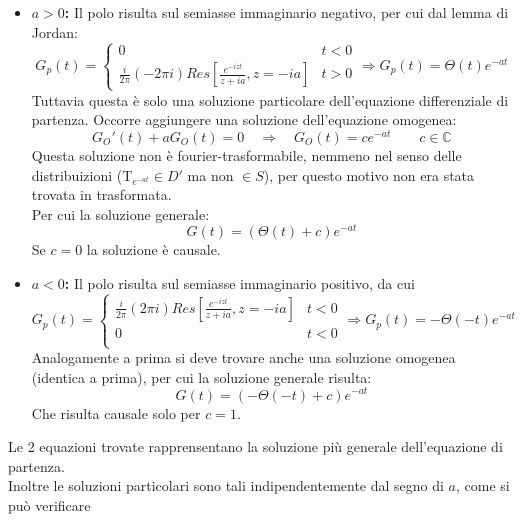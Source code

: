 \documentclass[twoside]{article}
\begin{document}
\begin{itemize}
    \item \textbf{$a>0$:} Il polo risulta sul semiasse immaginario negativo, per cui dal lemma di Jordan:
    \begin{equation}
       G_p(t)= \begin{cases}
            0 & t<0\\
            \frac{i}{2\pi}(-2\pi i) Res\left[\frac{e^{-izt}}{z+ia},z=-ia\right] & t>0
        \end{cases} \Longrightarrow
        G_p(t)=\Theta(t)e^{-at}
    \end{equation}
Tuttavia questa è solo una soluzione particolare dell'equazione differenziale di partenza. Occorre aggiungere una soluzione dell'equazione omogenea:
\begin{equation}
    G_O'(t)+aG_O(t)=0 \quad \Longrightarrow\quad G_O(t)=ce^{-at} \qquad c\in \mathds{C}
\end{equation}
Questa soluzione non è fourier-trasformabile, nemmeno nel senso delle distribuizioni (T$_{e^{-at}}\in D'$ ma non $\in S$), per questo motivo non era stata trovata in trasformata.\\
Per cui la soluzione generale:
\begin{equation}
    G(t)=(\Theta(t)+c)e^{-at}
\end{equation}
Se $c=0$ la soluzione è causale.
\item \textbf{$a<0$:} Il polo risulta sul semiasse immaginario positivo, da cui 
\begin{equation}
        G_p(t)=\begin{cases}
            \frac{i}{2\pi}(2\pi i) Res\left[\frac{e^{-izt}}{z+ia},z=-ia\right] & t<0\\
            0 & t<0\\
        \end{cases} \Longrightarrow
        G_p(t)=-\Theta(-t)e^{-at}
    \end{equation}
Analogamente a prima si deve trovare anche una soluzione omogenea (identica a prima), per cui la soluzione generale risulta:
\begin{equation}
    G(t)=(-\Theta(-t)+c)e^{-at}
\end{equation}
Che risulta causale solo per $c=1$.
\end{itemize}
Le 2 equazioni trovate rapprensentano la soluzione più generale dell'equazione di partenza. \\
Inoltre le soluzioni particolari sono tali indipendentemente dal segno di $a$, come si può verificare
\end{document}
